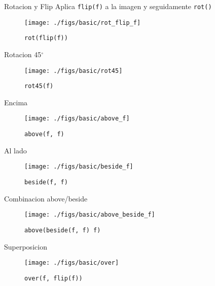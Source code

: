 \documentclass{beamer}
\begin{document}
    \begin{frame}{Rotacion y Flip}
        Aplica \texttt{flip(f)} a la imagen y seguidamente \texttt{rot()}

        \begin{figure}
            \centering
            \texttt{[image: ./figs/basic/rot\_flip\_f]}
            \caption{\texttt{rot(flip(f))}}
            \label{fig:rot_flip_f}
        \end{figure}
    \end{frame}

    \begin{frame}{Rotacion 45$^{\circ}$}
        \begin{figure}
            \centering
            \texttt{[image: ./figs/basic/rot45]}
            \caption{\texttt{rot45(f)}}
            \label{fig:rot45}
        \end{figure}
    \end{frame}

    \begin{frame}{Encima}
        \begin{figure}
            \centering
            \texttt{[image: ./figs/basic/above\_f]}
            \caption{\texttt{above(f, f)}}
            \label{fig:above}
        \end{figure}
    \end{frame}

    \begin{frame}{Al lado}
        \begin{figure}
            \centering
            \texttt{[image: ./figs/basic/beside\_f]}
            \caption{\texttt{beside(f, f)}}
            \label{fig:beside}
        \end{figure}
    \end{frame}

    \begin{frame}{Combinacion above/beside}
        \begin{figure}
            \centering
            \texttt{[image: ./figs/basic/above\_beside\_f]}
            \caption{\texttt{above(beside(f, f) f)}}
            \label{fig:above_beside_f}
        \end{figure}
    \end{frame}

    \begin{frame}{Superposicion}
        \begin{figure}
            \centering
            \texttt{[image: ./figs/basic/over]}
            \caption{\texttt{over(f, flip(f))}}
            \label{fig:over_f}
        \end{figure}
    \end{frame}
\end{document}

